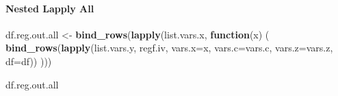 \documentclass[
]{book}
\newenvironment{Shaded}{\begin{snugshade}}{\end{snugshade}}
\newcommand{\ControlFlowTok}[1]{\textcolor[rgb]{0.13,0.29,0.53}{\textbf{#1}}}
\newcommand{\DataTypeTok}[1]{\textcolor[rgb]{0.13,0.29,0.53}{#1}}
\newcommand{\KeywordTok}[1]{\textcolor[rgb]{0.13,0.29,0.53}{\textbf{#1}}}
\newcommand{\NormalTok}[1]{#1}
\newcommand{\StringTok}[1]{\textcolor[rgb]{0.31,0.60,0.02}{#1}}
\begin{document}
\hypertarget{nested-lapply-all}{%
\paragraph{Nested Lapply All}\label{nested-lapply-all}}

\begin{Shaded}
\begin{Highlighting}[]
\NormalTok{df.reg.out.all <-}\StringTok{ }\KeywordTok{bind_rows}\NormalTok{(}\KeywordTok{lapply}\NormalTok{(list.vars.x,}
                      \ControlFlowTok{function}\NormalTok{(x) (}
                          \KeywordTok{bind_rows}\NormalTok{(}\KeywordTok{lapply}\NormalTok{(list.vars.y, regf.iv, }\DataTypeTok{vars.x=}\NormalTok{x, }\DataTypeTok{vars.c=}\NormalTok{vars.c, }\DataTypeTok{vars.z=}\NormalTok{vars.z, }\DataTypeTok{df=}\NormalTok{df))}
\NormalTok{                      )))}
\end{Highlighting}
\end{Shaded}

\begin{Shaded}
\begin{Highlighting}[]
\NormalTok{df.reg.out.all}
\end{Highlighting}
\end{Shaded}
\end{document}
